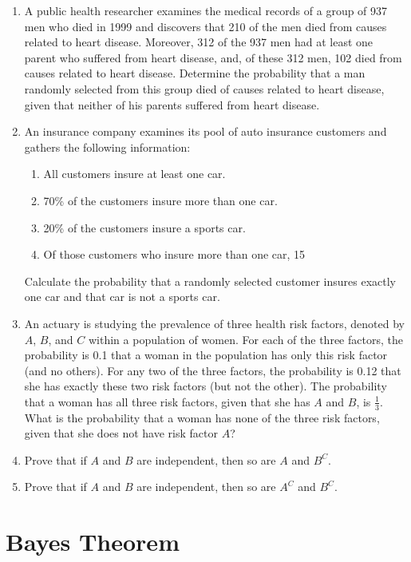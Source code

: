 \documentclass[../main.tex]{subfiles}
\begin{document}
{\begin{enumerate}
	\item A public health researcher examines the medical records of a group of 937
	men who died in 1999 and discovers that 210 of the men died from causes
	related to heart disease. Moreover, 312 of the 937 men had at least one
	parent who suffered from heart disease, and, of these 312 men, 102 died from
	causes related to heart disease.
	Determine the probability that a man randomly selected from this group died
	of causes related to heart disease, given that neither of his parents suffered
	from heart disease.
	
	\item An insurance company examines its pool of auto insurance customers and
	gathers the following information:
	\begin{enumerate}
		\item All customers insure at least one car.
		\item  70\% of the customers insure more than one car.
		\item  20\% of the customers insure a sports car.
		\item Of those customers who insure more than one car, 15%
	\end{enumerate}
	Calculate the probability that a randomly selected customer insures exactly
	one car and that car is not a sports car.


	\item An actuary is studying the prevalence of three health risk factors, denoted
	by $A$, $B$, and $C$ within a population of women. For each of the three factors,
	the probability is 0.1 that a woman in the population has only this risk factor
	(and no others). For any two of the three factors, the probability is 0.12 that
	she has exactly these two risk factors (but not the other). The probability
	that a woman has all three risk factors, given that she has $A$ and $B$, is 
	$\frac13$.
	What is the probability that a woman has none of the three risk factors,
	given that she does not have risk factor $A$?
	
	\item Prove that if $A$ and $B$ are independent, then so are $A$ and $B^C$.
	
	\item Prove that if $A$ and $B$ are independent, then so are $A^C$ and $B^C$.
\end{enumerate}
}

\section{Bayes Theorem}
\end{document}

